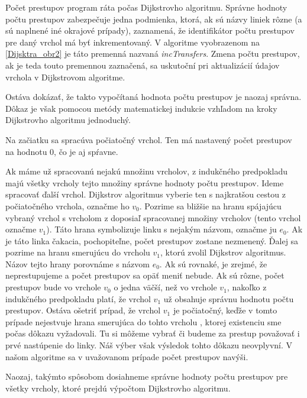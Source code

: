 Počet prestupov program ráta počas Dijkstrovho algoritmu. Správne hodnoty počtu prestupov zabezpečuje jedna podmienka, ktorá, ak sú názvy liniek rôzne (a sú naplnené iné okrajové prípady), zaznamená, že identifikátor počtu prestupov pre daný vrchol má byť inkrementovaný. V algoritme vyobrazenom na \ref{Dijsktra_obr2} je táto premenná nazvaná \textit{incTransfers}. Zmena počtu prestupov, ak je teda touto premennou zaznačená, sa uskutoční pri aktualizácií údajov vrchola v Dijkstrovom algoritme.\newline

Ostáva dokázať, že takto vypočítaná hodnota počtu prestupov je naozaj správna. Dôkaz je však pomocou metódy matematickej indukcie vzhľadom na kroky Dijkstrovho algoritmu jednoduchý.\newline

Na začiatku sa spracúva počiatočný vrchol. Ten má nastavený počet prestupov na hodnotu 0, čo je aj spŕavne.\newline

Ak máme už spracovanú nejakú množinu vrcholov, z indukčného predpokladu majú všetky vrcholy tejto množiny správne hodnoty počtu prestupov. Ideme spracovať ďalší vrchol. Dijkstrov algoritmus vyberie ten s najkratšou cestou z počiatočného vrchola, označme ho $v_{0}$. Pozrime sa bližšie na hranu spájajúcu vybraný vrchol s vrcholom z doposiaľ spracovanej množiny vrcholov (tento vrchol označme $v_{1}$). Táto hrana symbolizuje linku s nejakým názvom, označme ju $e_{0}$. Ak je táto linka čakacia, pochopiteľne, počet prestupov zostane nezmenený. Ďalej sa pozrime na hranu smerujúcu do vrcholu $v_{1}$, ktorú zvolil Dijkstrov algoritmus. Názov tejto hrany porovnáme s názvom $e_{0}$. Ak sú rovnaké, je zrejmé, že neprestupujeme a počet prestupov sa opäť meniť nebude. Ak sú rôzne, počet prestupov bude vo vrchole $v_{0}$ o jedna väčší, než vo vrchole $v_{1}$, nakoľko z indukčného predpokladu platí, že vrchol $v_{1}$ už obsahuje správnu hodnotu počtu prestupov. Ostáva ošetriť prípad, že vrchol $v_{1}$ je počiatočný, keďže v tomto prípade nejestvuje hrana smerujúca do tohto vrcholu , ktorej existenciu sme počas dôkazu vyžadovali. Tu si môžeme vybrať či budeme za prestup považovať i prvé nastúpenie do linky. Náš výber však výsledok tohto dôkazu neovplyvní. V našom algoritme sa v uvažovanom prípade počet prestupov navýši.\newline

Naozaj, takýmto spôsobom dosiahneme správne hodnoty počtu prestupov pre všetky vrcholy, ktoré prejdú výpočtom Dijkstrovho algoritmu.\newline


